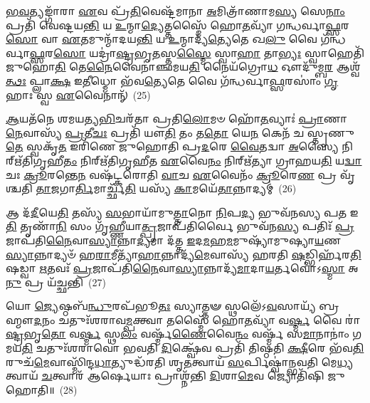 \-\ul{𑌭}\-\-\ul{𑌵}\-𑌤𑍍𑌯𑌙𑍍𑌗𑌾᳴𑌰𑌾 \ul{𑌏}\-𑌵 𑌪𑍍𑌰᳴\-\ul{𑌤𑌿}\-𑌵𑍇𑌷𑍍𑌟᳴𑌮𑌾𑌨𑌾 \ul{𑌅}\-𑌮𑌿𑌤𑍍𑌰𑌾᳴𑌣𑌾𑌮\-\ul{𑌸𑍍𑌯} 𑌸𑍇\-\ul{𑌨𑌾𑌂} 𑌪𑍍𑌰𑌤𑌿᳴ 𑌵𑍇𑌷𑍍𑌟𑌯\-\ul{𑌨𑍍𑌤𑌿} 𑌯 \ul{𑌉}\-𑌨𑍍𑌮𑌾\-\ul{𑌦𑍍𑌯𑍇}\-𑌤𑍍𑌤𑌸𑍍𑌮𑍈᳴ 𑌹𑍋\-\ul{𑌤}\-𑌵𑍍𑌯𑌾᳴ 𑌗𑌨𑍍𑌧𑌰𑍍𑌵𑌾\-\ul{𑌫𑍍𑌸}\-𑌰\-\ul{𑌸𑍋} 𑌵𑌾 \ul{𑌏}\-𑌤𑌮𑍁𑌨𑍍𑌮𑌾᳴𑌦𑌯\-\ul{𑌨𑍍𑌤𑌿} 𑌯 \ul{𑌉}\-𑌨𑍍𑌮𑌾𑌦𑍍𑌯᳴\-\ul{𑌤𑍍𑌯𑍇}\-𑌤𑍇 𑌖\-\ul{𑌲𑍁} 𑌵𑍈 𑌗᳴𑌨𑍍𑌧𑌰𑍍𑌵𑌾\-\ul{𑌫𑍍𑌸}\-𑌰\-\ul{𑌸𑍋} 𑌯𑌦𑍍𑌰𑌾॑\-\ul{𑌷𑍍𑌟𑍍𑌰}\-𑌭𑍃\-\ul{𑌤}\-𑌸𑍍𑌤\-\ul{𑌸𑍍𑌮𑍈} 𑌸𑍍𑌵𑌾\-\ul{𑌹𑌾} 𑌤𑌾\-\ul{𑌭𑍍𑌯𑌃} 𑌸𑍍𑌵𑌾𑌹𑍇𑌤𑌿᳴ 𑌜𑍁𑌹𑍋\-\ul{𑌤𑌿} 𑌤𑍇\-\ul{𑌨𑍈}\-𑌵𑍈𑌨𑌾॑𑌞𑍍𑌛𑌮𑌯\-\ul{𑌤𑌿} 𑌨𑍈𑌯᳴𑌗𑍍𑌰𑍋\-\ul{𑌧} 𑌔𑌦𑍁᳴𑌮𑍍𑌬\-\ul{𑌰} 𑌆𑌶𑍍𑌵᳴\-\ul{𑌤𑍍𑌥𑌃} 𑌪𑍍𑌲𑌾\-\ul{𑌕𑍍𑌷} 𑌇\-\ul{𑌤𑍀}\-𑌧𑍍𑌮𑍋 𑌭᳴𑌵\-\ul{𑌤𑍍𑌯𑍇}\-𑌤𑍇 𑌵𑍈 𑌗᳴𑌨𑍍𑌧𑌰𑍍𑌵𑌾\-\ul{𑌫𑍍𑌸}\-𑌰𑌸𑌾𑌂॑ \ul{𑌗𑍃}\-𑌹𑌾𑌃 𑌸𑍍𑌵 \ul{𑌏}\-𑌵𑍈𑌨𑌾𑌨𑍍᳴~(25)

\-\ul{𑌆}\-𑌯𑌤᳴𑌨𑍇 𑌶𑌮𑌯𑌤𑍍𑌯\-\ul{𑌭𑌿}\-𑌚𑌰᳴𑌤𑌾 𑌪𑍍𑌰𑌤𑌿\-\ul{𑌲𑍋}\-𑌮𑍞 𑌹𑍋᳴\-\ul{𑌤}\-𑌵𑍍𑌯𑌾𑌃॑ \ul{𑌪𑍍𑌰𑌾}\-𑌣𑌾\-\ul{𑌨𑍇}\-𑌵𑌾𑌸𑍍𑌯᳴ \ul{𑌪𑍍𑌰}\-𑌤𑍀\-\ul{𑌚𑌃} 𑌪𑍍𑌰𑌤𑌿᳴ 𑌯𑍗\-\ul{𑌤𑌿} 𑌤𑌂 𑌤\-\ul{𑌤𑍋} 𑌯𑍇\-\ul{𑌨} 𑌕𑍇𑌨᳴ 𑌚 𑌸𑍍𑌤𑍃𑌣𑍁\-\ul{𑌤𑍇} 𑌸𑍍𑌵𑌕𑍃᳴\-\ul{𑌤} 𑌇𑌰𑌿᳴𑌣𑍇 𑌜𑍁𑌹𑍋𑌤𑌿 𑌪𑍍𑌰\-\ul{𑌦}\-𑌰𑍇 \ul{𑌵𑍈}\-𑌤𑌦𑍍𑌵𑌾 \ul{𑌅}\-𑌸𑍍𑌯𑍈 𑌨𑌿𑌰𑍍\mbox{}𑌋᳴𑌤𑌿𑌗𑍃𑌹𑍀\-\ul{𑌤𑌂} 𑌨𑌿𑌰𑍍\mbox{}𑌋᳴𑌤𑌿𑌗𑍃𑌹𑍀𑌤 \ul{𑌏}\-𑌵𑍈\-\ul{𑌨𑌂} 𑌨𑌿𑌰𑍍\mbox{}𑌋᳴𑌤𑍍𑌯𑌾 𑌗𑍍𑌰𑌾𑌹𑌯\-\ul{𑌤𑌿} 𑌯\-\ul{𑌦𑍍𑌵𑌾}\-𑌚𑌃 \ul{𑌕𑍍𑌰𑍂}\-𑌰𑌨𑍍𑌤𑍇\-\ul{𑌨} 𑌵𑌷᳴𑌟𑍍𑌕𑌰𑍋𑌤𑌿 \ul{𑌵𑌾}\-𑌚 \ul{𑌏}\-𑌵𑍈𑌨𑌂᳴ \ul{𑌕𑍍𑌰𑍂}\-𑌰𑍇\-\ul{𑌣} 𑌪𑍍𑌰 𑌵𑍃᳴𑌶𑍍𑌚𑌤𑌿 \ul{𑌤𑌾}\-𑌜𑌗𑌾\-\ul{𑌰𑍍𑌤𑌿}\-𑌮𑌾𑌰𑍍𑌚𑍍𑌛᳴\-\ul{𑌤𑌿} 𑌯𑌸𑍍𑌯᳴ \ul{𑌕𑌾}\-𑌮𑌯𑍇᳴\-\ul{𑌤𑌾}\-𑌨𑍍𑌨𑌾𑌦𑍍𑌯𑌮𑍍॑~(26)

𑌆 𑌦᳴\-\ul{𑌦𑍀}\-𑌯𑍇\-\ul{𑌤𑌿} 𑌤𑌸𑍍𑌯᳴ \ul{𑌸}\-𑌭𑌾𑌯𑌾᳴𑌮𑍁\-\ul{𑌤𑍍𑌤𑌾}\-𑌨𑍋 \ul{𑌨𑌿}\-𑌪\-\ul{𑌦𑍍𑌯} 𑌭𑍁𑌵᳴𑌨𑌸𑍍𑌯 𑌪\-\ul{𑌤} 𑌇\-\ul{𑌤𑌿} 𑌤𑍃𑌣𑌾᳴\-\ul{𑌨𑌿} 𑌸𑌂 𑌗𑍃᳴𑌹𑍍𑌣𑍀𑌯𑌾\-\ul{𑌤𑍍𑌪𑍍𑌰}\-𑌜𑌾𑌪᳴𑌤𑌿𑌰𑍍𑌵𑍈 𑌭𑍁𑌵᳴𑌨\-\ul{𑌸𑍍𑌯} 𑌪𑌤𑌿𑌃᳴ \ul{𑌪𑍍𑌰}\-𑌜𑌾𑌪᳴𑌤𑌿\-\ul{𑌨𑍈}\-𑌵𑌾\-\ul{𑌸𑍍𑌯𑌾}\-𑌨𑍍𑌨𑌾\-\ul{𑌦𑍍𑌯}\-𑌮𑌾 𑌦᳴𑌤𑍍𑌤 \ul{𑌇}\-𑌦\-\ul{𑌮}\-𑌹\-\ul{𑌮}\-𑌮𑍁𑌷𑍍𑌯𑌾᳴𑌮𑍁𑌷𑍍𑌯𑌾\-\ul{𑌯}\-𑌣\-\ul{𑌸𑍍𑌯𑌾}\-𑌨𑍍𑌨𑌾𑌦𑍍𑌯𑍞᳴ 𑌹\-\ul{𑌰𑌾}\-𑌮𑍀𑌤𑍍𑌯𑌾᳴\-\ul{𑌹𑌾}\-𑌨𑍍𑌨𑌾𑌦𑍍𑌯᳴\-\ul{𑌮𑍇}\-𑌵𑌾𑌸𑍍𑌯᳴ 𑌹𑌰𑌤𑌿 \ul{𑌷}\-𑌡𑍍𑌭𑌿𑌰𑍍\mbox{}𑌹᳴𑌰\-\ul{𑌤𑌿} 𑌷𑌡𑍍𑌵𑌾 \ul{𑌋}\-𑌤𑌵𑌃᳴ \ul{𑌪𑍍𑌰}\-𑌜𑌾𑌪᳴𑌤𑌿\-\ul{𑌨𑍈}\-𑌵𑌾\-\ul{𑌸𑍍𑌯𑌾}\-𑌨𑍍𑌨𑌾𑌦𑍍𑌯᳴\-\ul{𑌮𑌾}\-𑌦𑌾\-\ul{𑌯}\-𑌰𑍍𑌤𑌵𑍋॑\-𑌽\-\ul{𑌸𑍍𑌮𑌾} 𑌅\-\ul{𑌨𑍁} 𑌪𑍍𑌰 𑌯᳴𑌚𑍍𑌛𑌨𑍍𑌤𑌿~(27)

𑌯𑍋 \ul{𑌜𑍍𑌯𑍇}\-𑌷𑍍𑌠𑌬᳴\-\ul{𑌨𑍍𑌧𑍁}\-𑌰𑌪᳴𑌭𑍂\-\ul{𑌤𑌃} 𑌸𑍍𑌯𑌾𑌤𑍍𑌤𑍟 𑌸𑍍𑌥𑌲𑍇᳴\-𑌽\-\ul{𑌵}\-𑌸𑌾𑌯𑍍𑌯᳴ 𑌬𑍍𑌰𑌹𑍍𑌮𑍗\-\ul{𑌦}\-𑌨𑌂 𑌚𑌤𑍁𑌃᳴𑌶𑌰𑌾𑌵\-\ul{𑌮𑍍𑌪}\-𑌕𑍍𑌤𑍍𑌵𑌾 𑌤𑌸𑍍𑌮𑍈᳴ 𑌹𑍋\-\ul{𑌤}\-𑌵𑍍𑌯𑌾᳴ 𑌵\-\ul{𑌰𑍍𑌷𑍍𑌮} 𑌵𑍈 𑌰𑌾॑\-\ul{𑌷𑍍𑌟𑍍𑌰}\-𑌭𑍃\-\ul{𑌤𑍋} 𑌵\-\ul{𑌰𑍍𑌷𑍍𑌮} 𑌸𑍍𑌥\-\ul{𑌲𑌂} 𑌵𑌰𑍍𑌷𑍍𑌮᳴\-\ul{𑌣𑍈}\-𑌵𑍈\-\ul{𑌨𑌂} 𑌵𑌰𑍍𑌷𑍍𑌮᳴ 𑌸\-\ul{𑌮𑌾}\-𑌨𑌾𑌨𑌾𑌂॑ 𑌗𑌮𑌯\-\ul{𑌤𑌿} 𑌚𑌤𑍁𑌃᳴𑌶𑌰𑌾𑌵𑍋 𑌭𑌵𑌤𑌿 \ul{𑌦𑌿}\-𑌕𑍍𑌷𑍍𑌵𑍇᳴𑌵 𑌪𑍍𑌰𑌤𑌿᳴ 𑌤𑌿𑌷𑍍𑌠𑌤𑌿 \ul{𑌕𑍍𑌷𑍀}\-𑌰𑍇 𑌭᳴𑌵\-\ul{𑌤𑌿} 𑌰𑍁𑌚᳴\-\ul{𑌮𑍇}\-𑌵𑌾𑌸𑍍𑌮𑌿᳴\-𑌨𑍍𑌦\-\ul{𑌧𑌾}\-𑌤𑍍𑌯𑍁𑌦𑍍𑌧᳴𑌰𑌤𑌿 𑌶𑍃\-\ul{𑌤}\-𑌤𑍍𑌵𑌾𑌯᳴ \ul{𑌸}\-𑌰𑍍𑌪𑌿𑌷𑍍𑌵𑌾॑𑌨𑍍𑌭𑌵𑌤𑌿 𑌮𑍇\-\ul{𑌧𑍍𑌯}\-𑌤𑍍𑌵𑌾𑌯᳴ \ul{𑌚}\-𑌤𑍍𑌵𑌾𑌰᳴ 𑌆𑌰𑍍\mbox{}\-\ul{𑌷𑍇}\-𑌯𑌾𑌃 𑌪𑍍𑌰𑌾𑌶𑍍𑌨᳴𑌨𑍍𑌤𑌿 \ul{𑌦𑌿}\-𑌶𑌾\-\ul{𑌮𑍇}\-𑌵 𑌜𑍍𑌯𑍋𑌤𑌿᳴𑌷𑌿 𑌜𑍁𑌹𑍋𑌤𑌿॥~(28)

{\anuvakamend[{\-\ul{𑌗𑍍𑌰𑌾}\-𑌮𑍀 𑌯𑍁᳴𑌨\-\ul{𑌕𑍍𑌤𑍀}\-𑌧𑍍𑌮𑌃 𑌸𑍍𑌵 \ul{𑌏}\-𑌵𑍈𑌨𑌾᳴\-\ul{𑌨}\-𑌨𑍍𑌨𑌾𑌦𑍍𑌯𑌂᳴ 𑌯\-\ul{𑌚𑍍𑌛}\-𑌨𑍍𑌤𑍍𑌯𑍇\-\ul{𑌕𑌾}\-𑌨𑍍𑌨𑌪᳴\-\ul{𑌞𑍍𑌚𑌾}\-𑌶𑌚𑍍𑌚᳴}]}%

